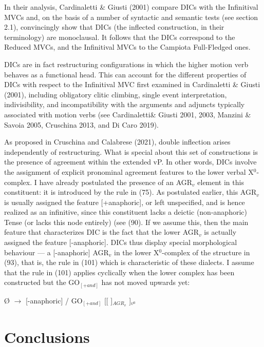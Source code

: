 \documentclass[output=paper,colorlinks,citecolor=brown,
]{langscibook}
\begin{document}
In their analysis, Cardinaletti \& Giusti (2001) compare DICs with the Infinitival MVCs and, on the basis of a number of syntactic and semantic tests (see section 2.1), convincingly show that DICs (the inflected construction, in their terminology) are monoclausal. It follows that the DICs correspond to the Reduced MVCs, and the Infinitival MVCs to the Campiota Full-Fledged ones.

DICs are in fact restructuring configurations in which the higher motion verb behaves as a functional head. This can account for the different properties of DICs with respect to the Infinitival MVC first examined in Cardinaletti \& Giusti (2001), including obligatory clitic climbing, single event interpretation, indivisibility, and incompatibility with the arguments and adjuncts typically associated with motion verbs (see Cardinaletti\& Giusti 2001, 2003, Manzini \& Savoia 2005, Cruschina 2013, and Di Caro 2019). 


As proposed in Cruschina and Calabrese (2021), double inflection arises independently of restructuring. What is special about this set of constructions is the presence of agreement within the extended vP. In other words, DICs involve the assignment of explicit pronominal agreement features to the lower verbal X$^0$-complex. I have already postulated the presence of an  AGR$_v$ element in this constituent: it is introduced by the rule in (75).  As postulated earlier, this AGR$_v$ is usually assigned the feature [+anaphoric], or left unspecified, and is hence realized as an infinitive, since this constituent lacks a deictic (non-anaphoric) Tense (or lacks this node entirely) (see (90). If we assume this, then the main feature that characterizes DIC is the fact that the lower  AGR$_v$ is actually assigned the feature [-anaphoric]. DICs thus display special morphological behaviour — a [-anaphoric] AGR$_v$ in the lower X$^0$-complex of the structure in (93), that is, the rule in (101) which is characteristic of these dialects. I assume that the rule in (101) applies cyclically when the lower complex has been constructed but the GO$_{[+and]}$ has not moved upwards yet:
 
\ea Ø $\rightarrow$ [-anaphoric] /  GO$_{[+and]}$ [[ \underline{\hspace{3em}} ]$_{ AGR_v}$ ]$_{v^0}$
\z

\section{Conclusions} 
 
\end{document}
